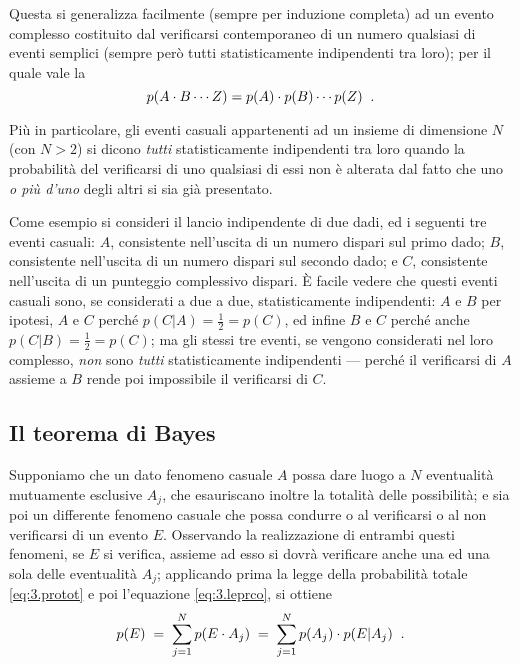 Questa si generalizza facilmente (sempre per induzione
completa) ad un evento complesso costituito dal verificarsi
contemporaneo di un numero qualsiasi di eventi semplici
(sempre per\`o tutti statisticamente indipendenti tra loro);
per il quale vale la
\begin{equation} \label{eq:3.procom}
  p(A \cdot B\cdots Z) = p(A) \cdot p(B)\cdots p(Z) \;\; .
\end{equation}%

%
Pi\`u in particolare, gli eventi casuali appartenenti ad un
insieme di dimensione $N$ (con $N>2$) si dicono \emph{tutti}
statisticamente indipendenti tra loro quando la
probabilit\`a del verificarsi di uno qualsiasi di essi non
\`e alterata dal fatto che uno \emph{o pi\`u d'uno} degli
altri si sia gi\`a presentato.

Come esempio si consideri il lancio indipendente di due
dadi, ed i seguenti tre eventi casuali: $A$, consistente
nell'uscita di un numero dispari sul primo dado; $B$,
consistente nell'uscita di un numero dispari sul secondo
dado; e $C$, consistente nell'uscita di un punteggio
complessivo dispari.  \`E facile vedere che questi eventi
casuali sono, se considerati a due a due, statisticamente
indipendenti: $A$ e $B$ per ipotesi, $A$ e $C$ perch\'e
$p(C|A) = \frac{1}{2} = p(C)$, ed infine $B$ e $C$ perch\'e
anche $p(C|B) = \frac{1}{2} = p(C)$; ma gli stessi tre
eventi, se vengono considerati nel loro complesso,
\emph{non} sono \emph{tutti} statisticamente indipendenti
--- perch\'e il verificarsi di $A$ assieme a $B$ rende poi
impossibile il verificarsi di $C$.%

\subsection{Il teorema di Bayes}%
Supponiamo che un dato fenomeno casuale $A$ possa dare luogo
a $N$ eventualit\`a mutuamente esclusive $A_j$, che
esauriscano inoltre la totalit\`a delle possibilit\`a; e sia
poi un differente fenomeno casuale che possa condurre o al
verificarsi o al non verificarsi di un evento $E$.
Osservando la realizzazione di entrambi questi fenomeni, se
$E$ si verifica, assieme ad esso si dovr\`a verificare anche
una ed una sola delle eventualit\`a $A_j$; applicando prima
la legge della probabilit\`a totale \eqref{eq:3.protot} e
poi l'equazione \eqref{eq:3.leprco}, si ottiene
\begin{equation} \label{eq:3.peaj}
  p(E) \; = \; \sum_{j=1}^N p(E \cdot A_j) \; = \;
    \sum_{j=1}^N p(A_j) \cdot p(E | A_j) \;\; .
\end{equation}

